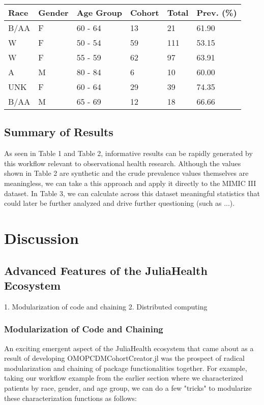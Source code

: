 \documentclass{juliacon}
\begin{document}
\begin{table}[!ht]
    \centering
    \begin{tabular}{|l|l|l|l|l|l|}
    \hline
        Race & Gender & Age Group & Cohort & Total & Prev. (\%) \\ \hline
        B/AA & F & 60 - 64 & 13 & 21 & 61.90 \\ \hline
        W & F & 50 - 54 & 59 & 111 & 53.15 \\ \hline
        W & F & 55 - 59 & 62 & 97 & 63.91 \\ \hline
        A & M & 80 - 84 & 6 & 10 & 60.00 \\ \hline
        UNK & F & 60 - 64 & 29 & 39 & 74.35 \\ \hline
        B/AA & M & 65 - 69 & 12 & 18 & 66.66 \\ \hline
    \end{tabular}
\end{table}

\subsection{Summary of Results}

As seen in Table 1 and Table 2, informative results can be rapidly generated by this workflow relevant to observational health research.
Although the values shown in Table 2 are synthetic and the crude prevalence values themselves are meaningless, we can take a this approach and apply it directly to the MIMIC III dataset.
In Table 3, we can calculate across this dataset meaningful statistics that could later be further analyzed and drive further questioning (such as ...).

\section{Discussion}

\subsection{Advanced Features of the JuliaHealth Ecosystem}

    1. Modularization of code and chaining
    2. Distributed computing

\subsubsection{Modularization of Code and Chaining}

An exciting emergent aspect of the JuliaHealth ecosystem that came about as a result of developing OMOPCDMCohortCreator.jl was the prospect of radical modularization and chaining of package functionalities together.
For example, taking our workflow example from the earlier section where we characterized patients by race, gender, and age group, we can do a few "tricks" to modularize these characterization functions as follows:
\end{document}
